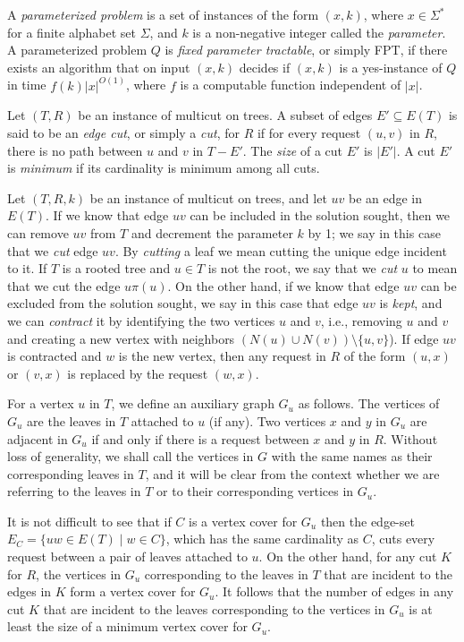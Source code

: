 \documentclass[11pt]{article}
\begin{document}
A {\it parameterized problem} is a set of instances of the form $(x,
k)$, where $x \in \Sigma^*$ for a finite alphabet set $\Sigma$, and
$k$ is a non-negative integer called the {\em parameter}.
A parameterized problem $Q$ is {\it fixed parameter tractable}, or
simply FPT, if there exists an algorithm that on input $(x, k)$
decides if $(x, k)$ is a yes-instance of $Q$ in time $f(k)|x|^{O(1)}$,
where $f$ is a computable function independent of $|x|$.

Let $(T, R)$ be an instance of {\sc multicut on trees}. A subset of edges $E' \subseteq E(T)$ is said to be an {\em edge cut}, or simply a {\em cut}, for $R$ if for every request $(u, v)$ in $R$, there is no path between $u$ and $v$ in $T - E'$. The {\em size} of a cut $E'$ is $|E'|$. A cut $E'$ is {\em minimum} if its cardinality is minimum among all cuts.

Let $(T, R, k)$ be an instance of {\sc multicut on trees}, and let $uv$ be an edge in $E(T)$. If we know that edge $uv$ can be included in the solution sought, then we can remove $uv$ from $T$ and decrement the parameter $k$ by 1; we say in this case that we {\em cut} edge $uv$. By {\em cutting} a leaf we mean cutting the unique edge incident to it. If $T$ is a rooted tree and $u \in T$ is not the root, we say that we {\em cut} $u$ to mean that we cut the edge $u\pi(u)$. On the other hand, if we know that edge $uv$ can be excluded from the solution sought, we say in this case that edge $uv$ is {\em kept}, and we can {\em contract} it by identifying the two vertices $u$ and $v$, i.e., removing $u$ and $v$ and creating a new vertex with neighbors $(N(u) \cup N(v)) \setminus \{u, v\}$). If edge $uv$ is contracted and $w$ is the new vertex, then any request in $R$ of the form $(u, x)$ or $(v, x)$ is replaced by the request $(w, x)$.

For a vertex $u$ in $T$, we define an auxiliary graph $G_u$ as follows. The vertices of $G_u$ are the leaves in $T$ attached to $u$ (if any). Two vertices $x$ and $y$ in $G_u$ are adjacent in $G_u$ if and only if there is a request between $x$ and $y$ in $R$. Without loss of generality, we shall call the vertices in $G$ with the same names as their corresponding leaves in $T$, and it will be clear from the context whether we are referring to the leaves in $T$ or to their corresponding vertices in $G_u$.

It is not difficult to see that if $C$ is a vertex cover for $G_u$ then the
edge-set $E_C = \{uw \in E(T) \mid w \in C\}$, which has the
same cardinality as $C$, cuts every request between a pair of leaves
attached to $u$. On the other hand, for any cut $K$ for
$R$, the vertices in $G_u$ corresponding to the leaves in $T$
that are incident to the edges in $K$ form a vertex cover for $G_u$. It follows
that the number of edges in any cut $K$ that are incident to the
leaves  corresponding to the vertices in $G_u$ is at least the size of a minimum
vertex cover for $G_u$.
\end{document}
